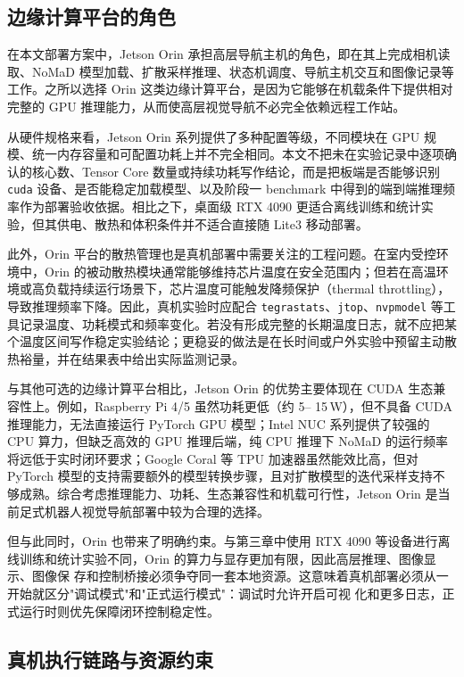 \subsection{边缘计算平台的角色}

在本文部署方案中，Jetson Orin 承担高层导航主机的角色，即在其上完成相机读取、NoMaD
模型加载、扩散采样推理、状态机调度、导航主机交互和图像记录等工作。之所以选择 Orin 这类边缘计算平台，是因为它能够在机载条件下提供相对完整的 GPU
推理能力，从而使高层视觉导航不必完全依赖远程工作站。

从硬件规格来看，Jetson Orin 系列提供了多种配置等级，不同模块在 GPU 规模、统一内存容量和可配置功耗上并不完全相同。本文不把未在实验记录中逐项确认的核心数、Tensor Core 数量或持续功耗写作结论，而是把板端是否能够识别 \texttt{cuda} 设备、是否能稳定加载模型、以及阶段一 benchmark 中得到的端到端推理频率作为部署验收依据。相比之下，桌面级 RTX 4090 更适合离线训练和统计实验，但其供电、散热和体积条件并不适合直接随 Lite3 移动部署。

此外，Orin 平台的散热管理也是真机部署中需要关注的工程问题。在室内受控环境中，Orin
的被动散热模块通常能够维持芯片温度在安全范围内；但若在高温环境或高负载持续运行场景下，芯片温度可能触发降频保护（thermal
throttling），导致推理频率下降。因此，真机实验时应配合 \texttt{tegrastats}、\texttt{jtop}、\texttt{nvpmodel} 等工具记录温度、功耗模式和频率变化。若没有形成完整的长期温度日志，就不应把某个温度区间写作稳定实验结论；更稳妥的做法是在长时间或户外实验中预留主动散热裕量，并在结果表中给出实际监测记录。

与其他可选的边缘计算平台相比，Jetson Orin 的优势主要体现在 CUDA 生态兼容性上。例如，Raspberry Pi 4/5 虽然功耗更低（约 5--
15\,W），但不具备 CUDA 推理能力，无法直接运行 PyTorch GPU 模型；Intel NUC 系列提供了较强的 CPU 算力，但缺乏高效的 GPU
推理后端，纯 CPU 推理下 NoMaD 的运行频率将远低于实时闭环要求；Google Coral 等 TPU 加速器虽然能效比高，但对 PyTorch
模型的支持需要额外的模型转换步骤，且对扩散模型的迭代采样支持不够成熟。综合考虑推理能力、功耗、生态兼容性和机载可行性，Jetson Orin
是当前足式机器人视觉导航部署中较为合理的选择。

但与此同时，Orin 也带来了明确约束。与第三章中使用 RTX 4090 等设备进行离线训练和统计实验不同，Orin 的算力与显存更加有限，因此高层推理、图像显示、图像保
存和控制桥接必须争夺同一套本地资源。这意味着真机部署必须从一开始就区分"调试模式"和"正式运行模式"：调试时允许开启可视
化和更多日志，正式运行时则优先保障闭环控制稳定性。

\subsection{真机执行链路与资源约束}

